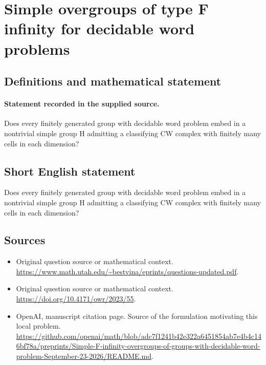 \documentclass[11pt]{article}
\begin{document}
\section*{Simple overgroups of type F infinity for decidable word problems}\label{statement}
\subsection{Definitions and mathematical statement}
\paragraph{Statement recorded in the supplied source.}
Does every finitely generated group with decidable word problem embed in a nontrivial simple group H admitting a classifying CW complex with finitely many cells in each dimension?
\subsection{Short English statement}
Does every finitely generated group with decidable word problem embed in a nontrivial simple group H admitting a classifying CW complex with finitely many cells in each dimension?
\subsection{Sources}
\begin{itemize}
\item[S1] Original question source or mathematical context.
\url{https://www.math.utah.edu/~bestvina/eprints/questions-updated.pdf}.
\item[S2] Original question source or mathematical context.
\url{https://doi.org/10.4171/owr/2023/55}.
\item[S3] OpenAI, manuscript citation page. Source of the formulation motivating this local problem.
\url{https://github.com/openai/math/blob/adc7f1241b42e322a6451854ab7e4b4c146bf78a/preprints/Simple-F-infinity-overgroups-of-groups-with-decidable-word-problem-September-23-2026/README.md}.
\end{itemize}
\end{document}
